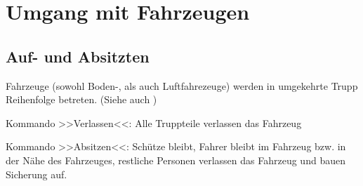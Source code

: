 \pagebreak
\section{Umgang mit Fahrzeugen}
\subsection{Auf- und Absitzten}
Fahrzeuge (sowohl Boden-, als auch Luftfahrezeuge) werden in umgekehrte Trupp Reihenfolge betreten. (Siehe auch )
\par\medskip
\begin{hint}
	Kommando >>Verlassen<<: Alle Truppteile verlassen das Fahrzeug
\end{hint}
\begin{hint}
	Kommando >>Absitzen<<: Schütze bleibt, Fahrer bleibt im Fahrzeug bzw. in der Nähe des Fahrzeuges, restliche Personen verlassen das Fahrzeug und bauen Sicherung auf.
\end{hint}

